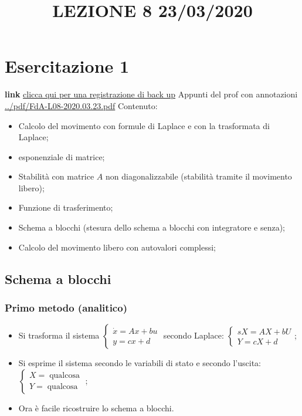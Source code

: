 \section{Esercitazione 1}
\title{LEZIONE 8 23/03/2020}\newline
\textbf{link} \href{https://onedrive.live.com/?authkey=%21AATVJK3srNwxGzs&id=EE092FF4FF7B5B0E%212158&cid=EE092FF4FF7B5B0E}{clicca qui per una registrazione di back up}\newline
\newline
Appunti del prof con annotazioni \url{../pdf/FdA-L08-2020.03.23.pdf}\newline
Contenuto:
\begin{itemize}
    \item Calcolo del movimento con formule di Laplace e con la trasformata di Laplace;
    \item esponenziale di matrice;
    \item Stabilità con matrice $A$ non diagonalizzabile (stabilità tramite il movimento libero);
    \item Funzione di trasferimento;
    \item Schema a blocchi (stesura dello schema a blocchi con integratore e senza);
    \item Calcolo del movimento libero con autovalori complessi;
\end{itemize}
\subsection{Schema a blocchi}
\subsubsection{Primo metodo (analitico)}
\begin{itemize}
    \item Si trasforma il sistema $\begin{cases}
        \dot{x} = A x + bu\\ y = cx +d
    \end{cases}$ secondo Laplace: $\begin{cases}
        s X = A X + b U\\ Y = c X + d
    \end{cases}$;
    \item Si esprime il sistema secondo le variabili di stato e secondo l'uscita:$\begin{cases}
        X = \;\text{qualcosa}\;\\ Y = \;\text{qualcosa}\;
    \end{cases}$;
    \item Ora è facile ricostruire lo schema a blocchi.
\end{itemize}
